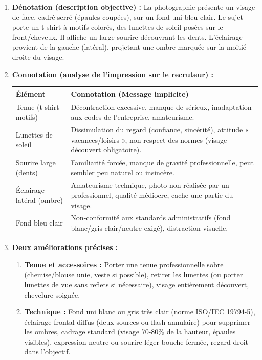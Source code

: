 \documentclass[11pt]{article}
\begin{document}
\begin{corrige}
\begin{enumerate}
    \item \textbf{Dénotation (description objective) :} La photographie présente un visage de face, cadré serré (épaules coupées), sur un fond uni bleu clair. Le sujet porte un t-shirt à motifs colorés, des lunettes de soleil posées sur le front/cheveux. Il affiche un large sourire découvrant les dents. L'éclairage provient de la gauche (latéral), projetant une ombre marquée sur la moitié droite du visage.
    \item \textbf{Connotation (analyse de l'impression sur le recruteur) :}
    \begin{center}
    \begin{tabularx}{\linewidth}{|l|X|}\hline
    \textbf{Élément} & \textbf{Connotation (Message implicite)} \\ \hline
    Tenue (t-shirt motifs) & Décontraction excessive, manque de sérieux, inadaptation aux codes de l'entreprise, amateurisme. \\ \hline
    Lunettes de soleil & Dissimulation du regard (confiance, sincérité), attitude « vacances/loisirs », non-respect des normes (visage découvert obligatoire). \\ \hline
    Sourire large (dents) & Familiarité forcée, manque de gravité professionnelle, peut sembler peu naturel ou insincère. \\ \hline
    Éclairage latéral (ombre) & Amateurisme technique, photo non réalisée par un professionnel, qualité médiocre, cache une partie du visage. \\ \hline
    Fond bleu clair & Non-conformité aux standards administratifs (fond blanc/gris clair/neutre exigé), distraction visuelle. \\ \hline
    \end{tabularx}
    \end{center}
    \item \textbf{Deux améliorations précises :}
    \begin{enumerate}
        \item \textbf{Tenue et accessoires :} Porter une tenue professionnelle sobre (chemise/blouse unie, veste si possible), retirer les lunettes (ou porter lunettes de vue sans reflets si nécessaire), visage entièrement découvert, chevelure soignée.
        \item \textbf{Technique :} Fond uni blanc ou gris très clair (norme ISO/IEC 19794-5), éclairage frontal diffus (deux sources ou flash annulaire) pour supprimer les ombres, cadrage standard (visage 70-80\% de la hauteur, épaules visibles), expression neutre ou sourire léger bouche fermée, regard droit dans l'objectif.
    \end{enumerate}
\end{enumerate}
\end{corrige}
\end{document}
